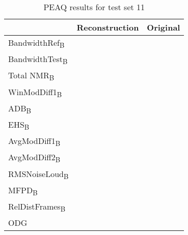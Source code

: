 \begin{table}\begin{center}
\caption{PEAQ results for test set 11}
\label{tab:PEAQdata4}
\begin{tabular}{|l|c|c|}
  \hline
                                    & Reconstruction & Original \\ \hline
  BandwidthRef\textsubscript{B}     &                & \\
  BandwidthTest\textsubscript{B}    &                & \\
  Total NMR\textsubscript{B}        &                & \\
  WinModDiff1\textsubscript{B}      &                & \\
  ADB\textsubscript{B}              &                & \\
  EHS\textsubscript{B}              &                & \\
  AvgModDiff1\textsubscript{B}      &                & \\
  AvgModDiff2\textsubscript{B}      &                & \\
  RMSNoiseLoud\textsubscript{B}     &                & \\
  MFPD\textsubscript{B}             &                & \\
  RelDistFrames\textsubscript{B}    &                & \\
  ODG                               &                & \\
  \hline
\end{tabular}
\end{center}\end{table}


